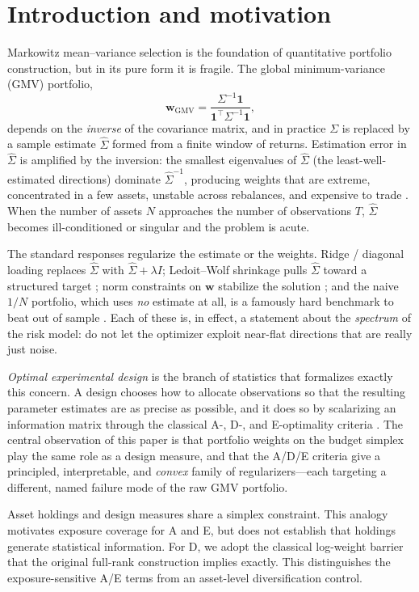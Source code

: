 \documentclass[11pt]{article}
\newcommand{\Sig}{\Sigma}
\newcommand{\Sighat}{\hat\Sigma}
\newcommand{\one}{\mathbf{1}}
\newcommand{\w}{\mathbf{w}}
\begin{document}
\section{Introduction and motivation}
Markowitz mean--variance selection \cite{markowitz1952} is the foundation of
quantitative portfolio construction, but in its pure form it is fragile. The
global minimum-variance (GMV) portfolio,
\[
  \w_{\mathrm{GMV}}=\frac{\Sig^{-1}\one}{\one^\top\Sig^{-1}\one},
\]
depends on the \emph{inverse} of the covariance matrix, and in practice $\Sig$ is
replaced by a sample estimate $\Sighat$ formed from a finite window of returns.
Estimation error in $\Sighat$ is amplified by the inversion: the smallest
eigenvalues of $\Sighat$ (the least-well-estimated directions) dominate
$\Sighat^{-1}$, producing weights that are extreme, concentrated in a few
assets, unstable across rebalances, and expensive to trade
\cite{brittenjones1999}. When the number of assets $N$ approaches the number of
observations $T$, $\Sighat$ becomes ill-conditioned or singular and the problem
is acute.

The standard responses regularize the estimate or the weights. Ridge / diagonal
loading replaces $\Sighat$ with $\Sighat+\lambda I$; Ledoit--Wolf shrinkage
pulls $\Sighat$ toward a structured target \cite{ledoitwolf2004}; norm
constraints on $\w$ stabilize the solution \cite{demiguel2009norm, man17}; and the naive
$1/N$ portfolio, which uses \emph{no} estimate at all, is a famously hard
benchmark to beat out of sample \cite{demiguel2009}. Each of these is, in effect,
a statement about the \emph{spectrum} of the risk model: do not let the optimizer
exploit near-flat directions that are really just noise.

\emph{Optimal experimental design} is the branch of statistics that formalizes
exactly this concern. A design chooses how to allocate observations so that the
resulting parameter estimates are as precise as possible, and it does so by
scalarizing an information matrix through the classical A-, D-, and E-optimality
criteria \cite{atk07, fed72, bergerwong, pukelsheim2006}. The central observation of this paper
is that portfolio weights on the budget simplex play the same role as a design
measure, and that the A/D/E criteria give a principled, interpretable, and
\emph{convex} family of regularizers---each targeting a different, named failure
mode of the raw GMV portfolio.

Asset holdings and design measures share a simplex constraint. This analogy motivates exposure coverage for A and E, but does not establish that holdings generate statistical information. For D, we adopt the classical log-weight barrier that the original full-rank construction implies exactly. This distinguishes the exposure-sensitive A/E terms from an asset-level diversification control.
\end{document}
